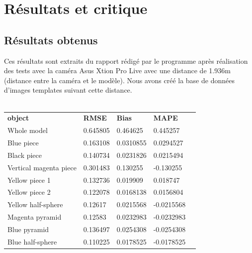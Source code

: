 \documentclass[a4paper, 12pt]{book}
\newcounter{program}[subsection]
\begin{document}
\section{Résultats et critique}
\subsection{Résultats obtenus}
Ces résultats sont extraits du rapport rédigé par le programme après réalisation des tests avec la caméra Asus Xtion Pro Live avec une distance de 1.936m (distance entre la caméra et le modèle). Nous avons créé la base de données d'images templates suivant cette distance.  \\ \\

\begin{table}[H]
\begin{tabular}{c|llll}
\cline{1-4}
\multicolumn{1}{|l|}{\textbf{object}}   & \multicolumn{1}{l|}{\textbf{RMSE}} & \multicolumn{1}{l|}{\textbf{Bias}} & \multicolumn{1}{l|}{\textbf{MAPE}} &  \\
\cline{1-4}
\multicolumn{1}{|l|}{Whole model}  & \multicolumn{1}{l|}{0.645805}  & \multicolumn{1}{l|}{0.464625}  & \multicolumn{1}{l|}{0.445257}  &  \\ 
\cline{1-4}
\multicolumn{1}{|l|}{Blue piece}  & \multicolumn{1}{l|}{0.163108}  & \multicolumn{1}{l|}{0.0310855}  & \multicolumn{1}{l|}{0.0294527}  &  \\ 
\cline{1-4}
\multicolumn{1}{|l|}{Black piece}  & \multicolumn{1}{l|}{0.140734}  & \multicolumn{1}{l|}{0.0231826}  & \multicolumn{1}{l|}{0.0215494}  &  \\ 
\cline{1-4}
\multicolumn{1}{|l|}{Vertical magenta piece}  & \multicolumn{1}{l|}{0.301483}  & \multicolumn{1}{l|}{0.130255}  & \multicolumn{1}{l|}{-0.130255}  &  \\ 
\cline{1-4}
\multicolumn{1}{|l|}{Yellow piece 1}  & \multicolumn{1}{l|}{0.132736}  & \multicolumn{1}{l|}{0.019909}  & \multicolumn{1}{l|}{0.018747}  &  \\ 
\cline{1-4}
\multicolumn{1}{|l|}{Yellow piece 2}  & \multicolumn{1}{l|}{0.122078}  & \multicolumn{1}{l|}{0.0168138}  & \multicolumn{1}{l|}{0.0156804}  &  \\ 
\cline{1-4}
\multicolumn{1}{|l|}{Yellow half-sphere}  & \multicolumn{1}{l|}{0.12617}  & \multicolumn{1}{l|}{0.0215568}  & \multicolumn{1}{l|}{-0.0215568}  &  \\ 
\cline{1-4}
\multicolumn{1}{|l|}{Magenta pyramid}  & \multicolumn{1}{l|}{0.12583}  & \multicolumn{1}{l|}{0.0232983}  & \multicolumn{1}{l|}{-0.0232983}  &  \\ 
\cline{1-4}
\multicolumn{1}{|l|}{Blue pyramid}  & \multicolumn{1}{l|}{0.136497}  & \multicolumn{1}{l|}{0.0254308}  & \multicolumn{1}{l|}{-0.0254308}  &  \\ 
\cline{1-4}
\multicolumn{1}{|l|}{Blue  half-sphere}  & \multicolumn{1}{l|}{0.110225}  & \multicolumn{1}{l|}{0.0178525}  & \multicolumn{1}{l|}{-0.0178525}  &  \\ 
\cline{1-4}
\end{tabular}
\end{table}
\end{document}
